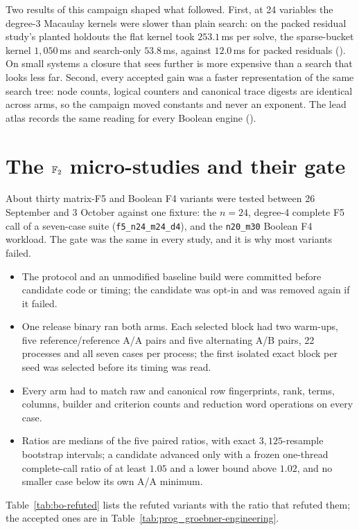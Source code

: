 Two results of this campaign shaped what followed. First, at 24 variables
the degree-3 Macaulay kernels were slower than plain search: on the packed
residual study's planted holdouts the flat kernel took $253.1$\,ms per solve,
the sparse-bucket kernel $1{,}050$\,ms and search-only $53.8$\,ms, against
$12.0$\,ms for packed residuals
(). On small
systems a closure that sees further is more expensive than a search that
looks less far. Second, every accepted gain was a faster representation of
the same search tree: node counts, logical counters and canonical trace
digests are identical across arms, so the campaign moved constants and
never an exponent. The lead atlas records the same reading for every
Boolean engine ().

\section{The $\mathbb{F}_2$ micro-studies and their gate}\label{sec:bo-gate}

About thirty matrix-F5 and Boolean F4 variants were tested between 26
September and 3 October against one fixture: the $n=24$, degree-4 complete
F5 call of a seven-case suite (\texttt{f5\_n24\_m24\_d4}), and the
\texttt{n20\_m30} Boolean F4 workload. The gate was the same in every study,
and it is why most variants failed.
\begin{itemize}
\item The protocol and an unmodified baseline build were committed before
  candidate code or timing; the candidate was opt-in and was removed again
  if it failed.
\item One release binary ran both arms. Each selected block had two
  warm-ups, five reference/reference A/A pairs and five alternating A/B
  pairs, 22 processes and all seven cases per process; the first isolated
  exact block per seed was selected before its timing was read.
\item Every arm had to match raw and canonical row fingerprints, rank,
  terms, columns, builder and criterion counts and reduction word
  operations on every case.
\item Ratios are medians of the five paired ratios, with exact
  $3{,}125$-resample bootstrap intervals; a candidate advanced only with a
  frozen one-thread complete-call ratio of at least $1.05$ and a lower
  bound above $1.02$, and no smaller case below its own A/A minimum.
\end{itemize}
Table~\ref{tab:bo-refuted} lists the refuted variants with the ratio that
refuted them; the accepted ones are in Table~\ref{tab:prog_groebner-engineering}.

